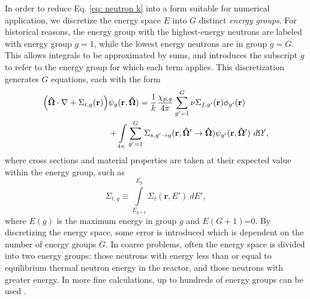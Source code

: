 In order to reduce Eq. \ref{eq: neutron k} into a form suitable for numerical application, we discretize
the energy space $E$ into $G$ distinct \emph{energy groups}.  For historical reasons, the energy group with
the highest-energy neutrons are labeled with energy group $g=1$, while the lowest energy neutrons are in group
$g=G$.  This allows integrals to be approximated by sums, and introduces the subscript $g$ to refer to the
energy group for which each term applies.  This discretization generates $G$ equations, each with the form
\begin{align}\label{eq: neutron energy}
  \qty(\mathbf{\hat\Omega}\cdot\nabla +
  \Sigma_{t,g}(\mathbf{r}))&\psi_g(\mathbf{r},\mathbf{\hat\Omega}) =
  \frac{1}{k}\frac{\chi_{p,g}}{4\pi}\sum_{g'=1}^G \nu\Sigma_{f,g'}(\mathbf{r})\phi_{g'}(\mathbf{r}) \nonumber \\
  & + \int\limits_{4\pi}^{} \sum_{g'=1}^G \Sigma_{s,g'\to g}(\mathbf{r},\mathbf{\hat\Omega'\to\hat\Omega})
  \psi_{g'}(\mathbf{r},\mathbf{\hat\Omega'}) \ d\Omega',
\end{align}
where cross sections and material properties are taken at their expected value within the energy group, such
as
\begin{equation}
  \Sigma_{t,g} \equiv \int\limits_{E_{g+1}}^{E_{g}} \Sigma_t(\mathbf{r},E')\ dE',
\end{equation}
where $E(g)$ is the maximum energy in group $g$ and $E(G+1)$=0.  By discretizing the energy space, some error
is introduced which is dependent on the number of energy groups $G$.  In coarse problems, often the energy
space is divided into two energy groups: those neutrons with energy less than or equal to equilibrium thermal
neutron energy in the reactor, and those neutrons with greater energy.
In more fine calculations, up to hundreds of energy groups can be used
\cite{lewistrans}.

